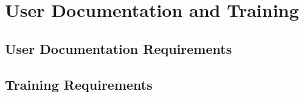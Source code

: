 \section{User Documentation and Training}
\subsection{User Documentation Requirements}
\subsection{Training Requirements}